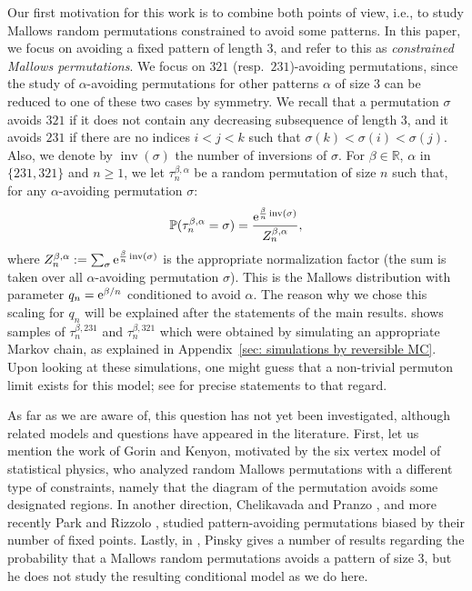 \documentclass[a4paper,11pt]{amsart}
\newcommand{\ee}{\textup{e}}
\newcommand{\R}{\mathbb R}
\DeclareMathOperator{\inv}{inv}
\theoremstyle{definition}
\begin{document}
Our first motivation for this work is to combine both points of view,
i.e., to study Mallows random permutations constrained to avoid some patterns.
In this paper, we focus on avoiding a fixed pattern of length 3,
and refer to this as \emph{constrained Mallows permutations}. 
We focus on $321$ (resp.~$231$)-avoiding permutations, since the study of $\alpha$-avoiding permutations for other patterns $\alpha$ of size 3 can be reduced to one of these two cases by symmetry. 
We recall that a permutation $\sigma$ avoids $321$ if it does not contain any decreasing subsequence of length $3$, and it avoids $231$ if there are no indices $i<j<k$ such that $\sigma(k) < \sigma(i) < \sigma(j)$. 
Also, we denote by $\inv(\sigma)$ the number of inversions of $\sigma$. 
For $\beta \in \R$, $\alpha$ in $\{231,321\}$ and $n \ge 1$, we let $\tau^{\beta,\alpha}_{n}$ be a random permutation of size $n$ such that, for any $\alpha$-avoiding permutation $\sigma$:
\begin{equation}\label{eq:def_Constraint_Mallows}
 \mathbb P(\tau^{\beta,\alpha}_{n} = \sigma) = \frac{\ee^{\frac{\beta}{n}\inv(\sigma)}}{Z_n^{\beta,\alpha}},
\end{equation}
where $Z_n^{\beta,\alpha} := \sum_{\sigma} \ee^{\frac{\beta}{n}\inv(\sigma)}$ is the appropriate normalization factor
(the sum is taken over all $\alpha$-avoiding permutation $\sigma$).
This is the Mallows distribution with parameter $q_n=\ee^{\beta/n}$ conditioned to avoid $\alpha$. 
The reason why we chose this scaling for $q_n$ will be explained after the statements of the main results.
 shows samples of $\tau^{\beta,231}_{n}$
and $\tau^{\beta,321}_{n}$ which were obtained by simulating an appropriate Markov chain,
as explained in Appendix~\ref{sec: simulations by reversible MC}.
Upon looking at these simulations, one might guess that a non-trivial permuton limit exists for this model;
see  for precise statements to that regard.
\medskip

As far as we are aware of, this question has not yet been investigated, although related models and questions
have appeared in the literature.
First, let us mention the work \cite{gorin2024six-vertex} of Gorin and Kenyon, motivated by the six vertex model
of statistical physics, who analyzed random Mallows permutations with a different type of constraints,
namely that the diagram of the permutation avoids some designated regions.
In another direction, Chelikavada and Pranzo \cite{chelikavada2023fixed_point_bias}, and more recently Park and Rizzolo \cite{park2025limittheoremsfixedpoint},
  studied pattern-avoiding permutations biased by their number of fixed points.
Lastly, in \cite{pinsky2021avoidance_Mallows}, Pinsky gives a number of results regarding the probability
that a Mallows random permutations avoids a pattern of size 3, 
but he does not study the resulting conditional model as we do here.
\bigskip
\end{document}
